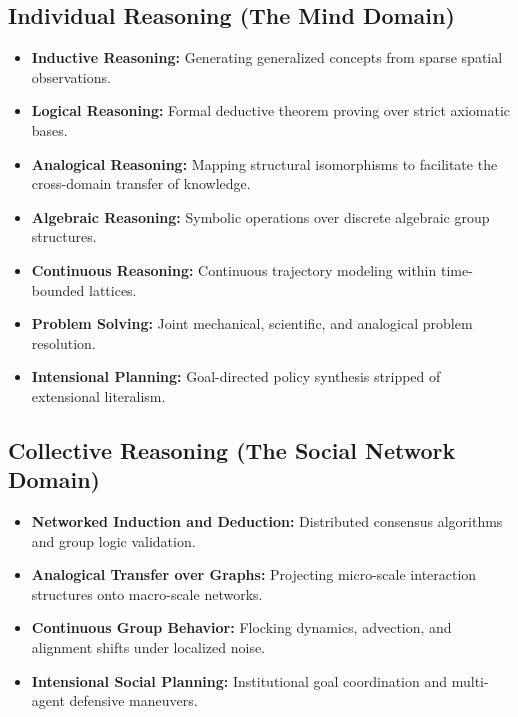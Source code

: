 \documentclass[11pt,fleqn]{article}
\begin{document}
\subsection{Individual Reasoning (The Mind Domain)}
\begin{itemize}
    \item \textbf{Inductive Reasoning:} Generating generalized concepts from sparse spatial observations.
    \item \textbf{Logical Reasoning:} Formal deductive theorem proving over strict axiomatic bases.
    \item \textbf{Analogical Reasoning:} Mapping structural isomorphisms to facilitate the cross-domain transfer of knowledge.
    \item \textbf{Algebraic Reasoning:} Symbolic operations over discrete algebraic group structures.
    \item \textbf{Continuous Reasoning:} Continuous trajectory modeling within time-bounded lattices.
    \item \textbf{Problem Solving:} Joint mechanical, scientific, and analogical problem resolution.
    \item \textbf{Intensional Planning:} Goal-directed policy synthesis stripped of extensional literalism.
\end{itemize}

\subsection{Collective Reasoning (The Social Network Domain)}
\begin{itemize}
    \item \textbf{Networked Induction and Deduction:} Distributed consensus algorithms and group logic validation.
    \item \textbf{Analogical Transfer over Graphs:} Projecting micro-scale interaction structures onto macro-scale networks.
    \item \textbf{Continuous Group Behavior:} Flocking dynamics, advection, and alignment shifts under localized noise.
    \item \textbf{Intensional Social Planning:} Institutional goal coordination and multi-agent defensive maneuvers.
\end{itemize}
\end{document}
